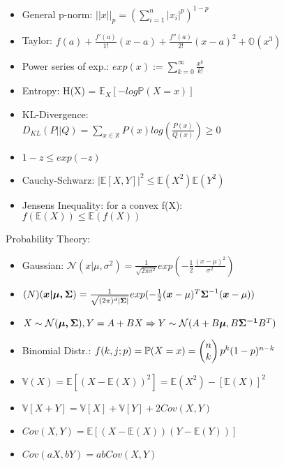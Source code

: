 \begin{itemize}
    \item General p-norm: $||x||_p = (\sum_{i=1}^{n}|x_i|^p)^{1-p}$
    \item Taylor: $f(a) + \frac{f'(a)}{1!}(x-a)  + \frac{f''(a)}{2!}(x-a)^2 + \mathbb{O}(x^3)$
    \item Power series of exp.: $exp(x) := \sum_{k=0}^{\infty}\frac{x^k}{k!}$
    \item Entropy: H(X) = $\mathbb{E}_X\left[-log\mathbb{P}(X=x)\right]$
    \item KL-Divergence: \\$D_{KL}(P||Q)=\sum_{x\in \mathbb{X}}P(x)log\left(\frac{P(x)}{Q(x)}\right) \geq 0$
    \item $1-z \leq exp(-z)$
    \item Cauchy-Schwarz: $|\mathbb{E}\left[X,Y\right]|^2 \leq\mathbb{E}(X^2)\mathbb{E}(Y^2)$
    \item Jensens Inequality: for a convex f(X): \\$f(\mathbb{E}(X))\leq\mathbb{E}(f(X))$
\end{itemize}
Probability Theory:
\begin{itemize}
    \item Gaussian: $\mathcal{N}(x|\mu,\sigma^2) = \frac{1}{\sqrt{2\pi\sigma^2}}exp(-\frac{1}{2}\frac{(x-\mu)^2}{\sigma^2})$
    \item $\mathcal(N)(\boldsymbol{x|\mu,\Sigma}) = \\\frac{1}{\sqrt{(2\pi)^d|\boldsymbol{\Sigma}|}}exp(-\frac{1}{2}(\boldsymbol{x} - \mu)^T\boldsymbol{\Sigma}^{-1}(\boldsymbol{x}-\mu))$
    \item $X\sim\mathcal{N}(\boldsymbol{\mu,\Sigma}), Y=A + BX \Rightarrow \\Y \sim \mathcal{N}(A + B\boldsymbol{\mu},B\boldsymbol{\Sigma^{-1}}B^T)$
    \item Binomial Distr.: $f(k,j;p) = \\\mathbb{P}(X=x)=\begin{pmatrix}
        n\\k
    \end{pmatrix}p^k(1-p)^{n-k}$
    \item $\mathbb{V}(X) = \mathbb{E}\left[(X-\mathbb{E}(X))^2\right]=\mathbb{E}(X^2) - \left[\mathbb{E}(X)\right]^2$
    \item $\mathbb{V}\left[X + Y\right] = \mathbb{V}\left[X\right] + \mathbb{V}\left[Y\right] + 2 Cov(X,Y)$
    \item $Cov(X,Y) = \mathbb{E}\left[(X-\mathbb{E}(X))(Y-\mathbb{E}(Y))\right]$
    \item $Cov(aX,bY) = abCov(X,Y)$
\end{itemize}
